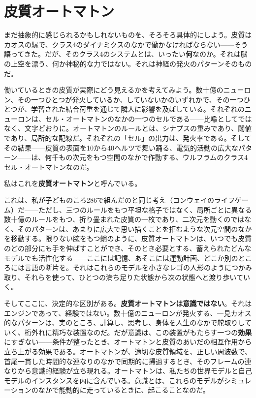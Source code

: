 \documentclass[11pt, twoside, openright]{book}
\begin{document}
\section*{皮質オートマトン}

まだ抽象的に感じられるかもしれないものを、そろそろ具体的にしよう。皮質はカオスの縁で、クラス4のダイナミクスのなかで働かなければならない------そう語ってきた。だが、そのクラス4のシステムとは、いったい\textbf{何}なのか。それは脳の上空を漂う、何か神秘的な力ではない。それは神経の発火のパターンそのものだ。

働いているときの皮質が実際にどう見えるかを考えてみよう。数十億のニューロン、その一つひとつが発火しているか、していないかのいずれかで、その一つひとつが、学習された結合荷重を通じて隣人に影響を及ぼしている。それぞれのニューロンは、セル・オートマトンのなかの一つのセルである------比喩としてではなく、文字どおりに。オートマトンのルールとは、シナプスの重みであり、閾値であり、局所的な配線だ。それぞれの「セル」の出力は、発火率である。そしてその結果------皮質の表面を10から40ヘルツで舞い踊る、電気的活動の広大なパターン------は、何千もの次元をもつ空間のなかで作動する、ウルフラムのクラス4セル・オートマトンなのだ。

私はこれを\textbf{皮質オートマトン}と呼んでいる。

これは、私が子どものころ286で組んだのと同じ考え（コンウェイのライフゲーム）だ------ただし、三つのルールをもつ平坦な格子ではなく、局所ごとに異なる数十億のルールをもつ、折り畳まれた皮質の一枚であり、二次元を動くのではなく、そのパターンは、あまりに広大で思い描くことを拒むような次元空間のなかを移動する。限りない腕をもつ蛸のように、皮質オートマトンは、いつでも皮質のどの部分にも手を伸ばすことができ、そのとき必要とする、蓄えられたどんなモデルでも活性化する------ここには記憶、あそこには運動計画、どこか別のところには言語の断片を。それはこれらのモデルを小さなレゴの人形のようにつかみ取り、それらを使って、ひとつの満ち足りた状態から次の状態へと渡り歩いていく。

そしてここに、決定的な区別がある。\textbf{皮質オートマトンは意識ではない}。それはエンジンであって、経験ではない。数十億のニューロンが発火する、一見カオス的なパターンは、実のところ、計算し、思考し、身体を人生のなかで舵取りしていく、桁外れに精巧な装置なのだ。だが意識は、この装置がもたらす一つの\textbf{効果}にすぎない------条件が整ったとき、オートマトンと皮質のあいだの相互作用から立ち上がる効果である。オートマトンが、適切な皮質領域を、正しい周波数で、首尾一貫した時間的な連なりのなかで同期的に掃過するとき、そのフレームの連なりから意識的経験が立ち現れる。オートマトンは、私たちの世界モデルと自己モデルのインスタンスを内に含んでいる。意識とは、これらのモデルがシミュレーションのなかで能動的に走っているときに、起こることなのだ。
\end{document}
